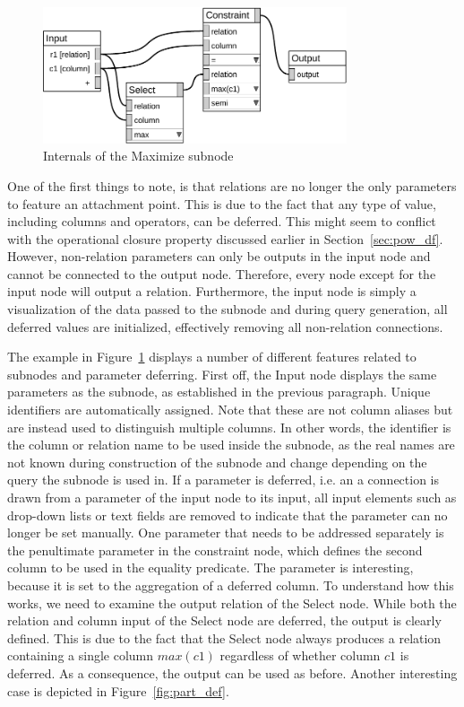 \documentclass[11pt,a4paper]{globis-book}
\begin{document}
\begin{figure}[h]
  \centering
  \includegraphics[width=0.8\textwidth]{resources/Subnode.pdf}
  \caption{Internals of the Maximize subnode}
  \label{fig:subnode}
\end{figure}

One of the first things to note, is that relations are no longer the only parameters to feature an attachment point. This is due to the fact that any type of value, including columns and operators, can be deferred. This might seem to conflict with the operational closure property discussed earlier in Section~\ref{sec:pow_df}. However, non-relation parameters can only be outputs in the input node and cannot be connected to the output node. Therefore, every node except for the input node will output a relation. Furthermore, the input node is simply a visualization of the data passed to the subnode and during query generation, all deferred values are initialized, effectively removing all non-relation connections.

The example in Figure~\ref{fig:subnode} displays a number of different features related to subnodes and parameter deferring. First off, the Input node displays the same parameters as the subnode, as established in the previous paragraph. Unique identifiers are automatically assigned. Note that these are not column aliases but are instead used to distinguish multiple columns. In other words, the identifier is the column or relation name to be used inside the subnode, as the real names are not known during construction of the subnode and change depending on the query the subnode is used in. If a parameter is deferred, i.e. an a connection is drawn from a parameter of the input node to its input, all input elements such as drop-down lists or text fields are removed to indicate that the parameter can no longer be set manually. One parameter that needs to be addressed separately is the penultimate parameter in the constraint node, which defines the second column to be used in the equality predicate. The parameter is interesting, because it is set to the aggregation of a deferred column. To understand how this works, we need to examine the output relation of the Select node. While both the relation and column input of the Select node are deferred, the output is clearly defined. This is due to the fact that the Select node always produces a relation containing a single column $max(c1)$ regardless of whether column $c1$ is deferred. As a consequence, the output can be used as before. Another interesting case is depicted in Figure~\ref{fig:part_def}.
\end{document}
